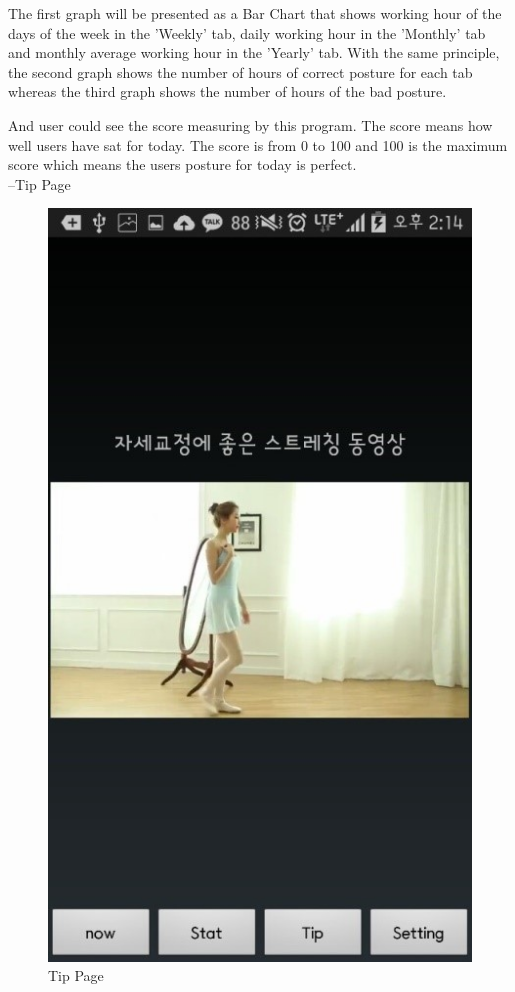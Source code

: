 \documentclass[conference]{IEEEtran}
\begin{document}
 The first graph will be presented as a Bar Chart that shows working hour of the days of the week in the 'Weekly' tab, daily working hour in the 'Monthly' tab and monthly average working hour in the 'Yearly' tab.
With the same principle, the second graph shows the number of hours of correct posture for each tab whereas the third graph shows the number of hours of the bad posture.

And user could see the score measuring by this program. The score means how well users have sat for today. The score is from 0 to 100 and 100 is the maximum score which means the users posture for today is perfect.\\

 --Tip Page

\begin{figure}[htbp]
\begin{center}
    \includegraphics[scale=1]{img_14}
    \caption{Tip Page} 
\end{center}
\end{figure}
\end{document}
